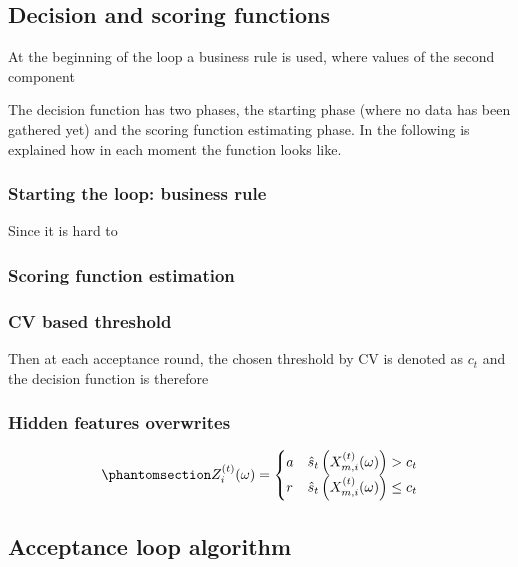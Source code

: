 \documentclass[
  12pt,
]{article}
\begin{document}
\subsection{Decision and scoring
functions}\label{decision-and-scoring-functions}

At the beginning of the loop a business rule is used, where values of
the second component

The decision function has two phases, the starting phase (where no data
has been gathered yet) and the scoring function estimating phase. In the
following is explained how in each moment the function looks like.

\subsubsection{Starting the loop: business
rule}\label{starting-the-loop-business-rule}

Since it is hard to

\subsubsection{Scoring function
estimation}\label{scoring-function-estimation}

\subsubsection{CV based threshold}\label{sec-cv-based-threshold}

Then at each acceptance round, the chosen threshold by CV is denoted as
\(c_t\) and the decision function is therefore

\subsubsection{Hidden features
overwrites}\label{sec-hidden-feats-overwrites}

\begin{equation}\protect\phantomsection\label{eq-Z-t-with-threshold-and-scorecard-no-overwrites}{
Z^{(t)}_i(\omega) = \begin{cases}
a & \hat{s}_t \left(X^{(t)}_{m, i} (\omega) \right) > c_t  \\
r & \hat{s}_t \left(X^{(t)}_{m, i} (\omega) \right) \leq c_t
\end{cases}
}\end{equation}

\subsection{Acceptance loop algorithm}\label{acceptance-loop-algorithm}
\end{document}
